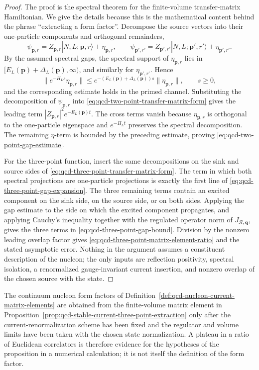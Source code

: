 \begin{proof}
The proof is the spectral theorem for the finite-volume transfer-matrix
Hamiltonian.  We give the details because this is the mathematical content
behind the phrase ``extracting a form factor''.  Decompose the source vectors
into their one-particle components and orthogonal remainders,
\[
  \psi_{\mathbf p,r}
  =
  Z_{\mathbf p,r}|N,L;\mathbf p,r\rangle+\eta_{\mathbf p,r},
  \qquad
  \psi_{\mathbf p',r'}
  =
  Z_{\mathbf p',r'}|N,L;\mathbf p',r'\rangle+\eta_{\mathbf p',r'}.
\]
By the assumed spectral gaps, the spectral support of
\(\eta_{\mathbf p,r}\) lies in
\([E_L(\mathbf p)+\Delta_L(\mathbf p),\infty)\), and similarly for
\(\eta_{\mathbf p',r'}\).  Hence
\[
  \|e^{-H_Ls}\eta_{\mathbf p,r}\|
  \le
  e^{-(E_L(\mathbf p)+\Delta_L(\mathbf p))s}\|\eta_{\mathbf p,r}\|,
  \qquad s\ge0,
\]
and the corresponding estimate holds in the primed channel.  Substituting the
decomposition of \(\psi_{\mathbf p,r}\) into
\eqref{eq:qcd-two-point-transfer-matrix-form} gives the leading term
\(|Z_{\mathbf p,r}|^2e^{-E_L(\mathbf p)t}\).  The cross terms vanish because
\(\eta_{\mathbf p,r}\) is orthogonal to the one-particle eigenspace and
\(e^{-H_Lt}\) preserves the spectral decomposition.  The remaining
\(\eta\)-term is bounded by the preceding estimate, proving
\eqref{eq:qcd-two-point-gap-estimate}.

For the three-point function, insert the same decompositions on the sink and
source sides of \eqref{eq:qcd-three-point-transfer-matrix-form}.  The term in
which both spectral projections are one-particle projections is exactly the
first line of \eqref{eq:qcd-three-point-gap-expansion}.  The three remaining
terms contain an excited component on the sink side, on the source side, or on
both sides.  Applying the gap estimate to the side on which the excited
component propagates, and applying Cauchy's inequality together with the
regulated operator norm of \(J_{\mathcal R,\mathbf q}\), gives the three
terms in \eqref{eq:qcd-three-point-gap-bound}.  Division by the nonzero
leading overlap factor gives \eqref{eq:qcd-three-point-matrix-element-ratio}
and the stated asymptotic error.  Nothing in the argument assumes a constituent
description of the nucleon; the only inputs are reflection positivity,
spectral isolation, a renormalized gauge-invariant current insertion, and
nonzero overlap of the chosen source with the state.
\end{proof}

The continuum nucleon form factors of
Definition~\ref{def:qcd-nucleon-current-matrix-elements} are obtained
from the finite-volume matrix element in
Proposition~\ref{prop:qcd-stable-current-three-point-extraction} only after
the current-renormalization scheme has been fixed and the regulator and
volume limits have been taken with the chosen state normalization.  A plateau
in a ratio of Euclidean correlators is therefore evidence for the hypotheses
of the proposition in a numerical calculation; it is not itself the definition
of the form factor.

